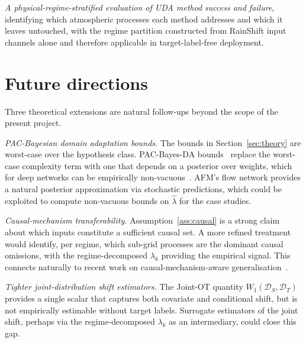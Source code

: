 \documentclass{article}
\begin{document}
\textit{A physical-regime-stratified evaluation of UDA method success
and failure}, identifying which atmospheric processes each method
addresses and which it leaves untouched, with the regime partition
constructed from RainShift input channels alone and therefore
applicable in target-label-free deployment.

\section{Future directions}\label{sec:future}

Three theoretical extensions are natural follow-ups beyond the scope
of the present project.

\emph{PAC-Bayesian domain adaptation bounds.} The bounds in
Section~\ref{sec:theory} are worst-case over the hypothesis class.
PAC-Bayes-DA bounds~\citep{germain2013pac} replace the worst-case
complexity term with one that depends on a posterior over weights,
which for deep networks can be empirically
non-vacuous~\citep{dziugaite2017computing}. AFM's flow network
provides a natural posterior approximation via stochastic predictions,
which could be exploited to compute non-vacuous bounds on
$\widehat\lambda$ for the case studies.

\emph{Causal-mechanism transferability.} Assumption~\ref{ass:causal}
is a strong claim about which inputs constitute a sufficient causal
set. A more refined treatment would identify, per regime, which
sub-grid processes are the dominant causal omissions, with the
regime-decomposed $\lambda_k$ providing the empirical signal. This
connects naturally to recent work on causal-mechanism-aware
generalisation~\citep{scholkopf2012causal}.

\emph{Tighter joint-distribution shift estimators.} The Joint-OT
quantity $W_1(\mathcal{D}_S, \mathcal{D}_T)$ provides a single scalar
that captures both covariate and conditional shift, but is not
empirically estimable without target labels. Surrogate estimators of
the joint shift, perhaps via the regime-decomposed $\lambda_k$ as an
intermediary, could close this gap.



\end{document}
